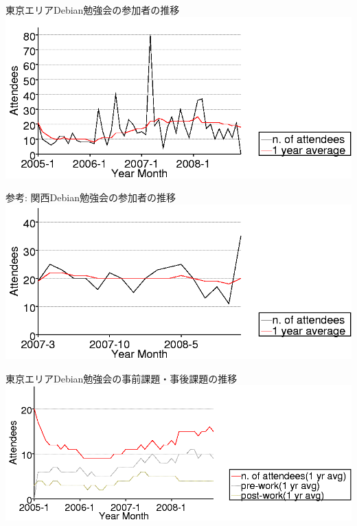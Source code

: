\section{}
\begin{frame}{東京エリアDebian勉強会の参加者の推移}
 \includegraphics[width=1\hsize]{image200812/serialized.png}
\end{frame}

\begin{frame}{参考: 関西Debian勉強会の参加者の推移}
 \includegraphics[width=1\hsize]{image200812/kansai.png}
\end{frame}

\begin{frame}{東京エリアDebian勉強会の事前課題・事後課題の推移}
 \includegraphics[width=1\hsize]{image200812/memberanalysis/attend.png}
\end{frame}

